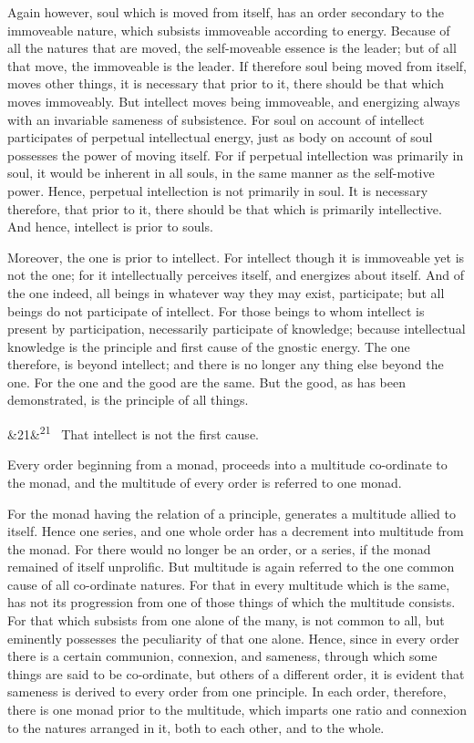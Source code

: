 \documentclass[12pt]{article}
\newcommand{\para}[1][]{\par\noindent\ifx&#1&\else\textsuperscript{\footnotesize #1}~\fi}
\begin{document}
Again however, soul which is moved from itself, has an order secondary to the immoveable nature, which subsists immoveable according to energy. Because of all the natures that are moved, the self-moveable essence is the leader; but of all that move, the immoveable is the leader. If therefore soul being moved from itself, moves other things, it is necessary that prior to it, there should be that which moves immoveably. But intellect moves being immoveable, and energizing always with an invariable sameness of subsistence. For soul on account of intellect participates of perpetual intellectual energy, just as body on account of soul possesses the power of moving itself. For if perpetual intellection was primarily in soul, it would be inherent in all souls, in the same manner as the self-motive power. Hence, perpetual intellection is not primarily in soul. It is necessary therefore, that prior to it, there should be that which is primarily intellective. And hence, intellect is prior to souls.

Moreover, the one is prior to intellect. For intellect though it is immoveable yet is not the one; for it intellectually perceives itself, and energizes about itself. And of the one indeed, all beings in whatever way they may exist, participate; but all beings do not participate of intellect. For those beings to whom intellect is present by participation, necessarily participate of knowledge; because intellectual knowledge is the principle and first cause of the gnostic energy. The one therefore, is beyond intellect; and there is no longer any thing else beyond the one. For the one and the good are the same. But the good, as has been demonstrated, is the principle of all things.

\para[21] That intellect is not the first cause.

Every order beginning from a monad, proceeds into a multitude co-ordinate to the monad, and the multitude of every order is referred to one monad.

For the monad having the relation of a principle, generates a multitude allied to itself. Hence one series, and one whole order has a decrement into multitude from the monad. For there would no longer be an order, or a series, if the monad remained of itself unprolific. But multitude is again referred to the one common cause of all co-ordinate natures. For that in every multitude which is the same, has not its progression from one of those things of which the multitude consists. For that which subsists from one alone of the many, is not common to all, but eminently possesses the peculiarity of that one alone. Hence, since in every order there is a certain communion, connexion, and sameness, through which some things are said to be co-ordinate, but others of a different order, it is evident that sameness is derived to every order from one principle. In each order, therefore, there is one monad prior to the multitude, which imparts one ratio and connexion to the natures arranged in it, both to each other, and to the whole.
\end{document}
